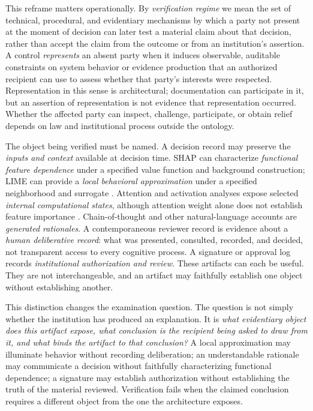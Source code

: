 This reframe matters operationally. By \emph{verification regime} we mean the set of technical, procedural, and evidentiary mechanisms by which a party not present at the moment of decision can later test a material claim about that decision, rather than accept the claim from the outcome or from an institution's assertion. A control \emph{represents} an absent party when it induces observable, auditable constraints on system behavior or evidence production that an authorized recipient can use to assess whether that party's interests were respected. Representation in this sense is architectural; documentation can participate in it, but an assertion of representation is not evidence that representation occurred. Whether the affected party can inspect, challenge, participate, or obtain relief depends on law and institutional process outside the ontology.

The object being verified must be named. A decision record may preserve the \emph{inputs and context} available at decision time. SHAP can characterize \emph{functional feature dependence} under a specified value function and background construction; LIME can provide a \emph{local behavioral approximation} under a specified neighborhood and surrogate \parencite{lundberg2017,ribeiro2016}. Attention and activation analyses expose selected \emph{internal computational states}, although attention weight alone does not establish feature importance \parencite{jain2019}. Chain-of-thought and other natural-language accounts are \emph{generated rationales}. A contemporaneous reviewer record is evidence about a \emph{human deliberative record}: what was presented, consulted, recorded, and decided, not transparent access to every cognitive process. A signature or approval log records \emph{institutional authorization and review}. These artifacts can each be useful. They are not interchangeable, and an artifact may faithfully establish one object without establishing another.

This distinction changes the examination question. The question is not simply whether the institution has produced an explanation. It is \emph{what evidentiary object does this artifact expose, what conclusion is the recipient being asked to draw from it, and what binds the artifact to that conclusion?} A local approximation may illuminate behavior without recording deliberation; an understandable rationale may communicate a decision without faithfully characterizing functional dependence; a signature may establish authorization without establishing the truth of the material reviewed. Verification fails when the claimed conclusion requires a different object from the one the architecture exposes.

